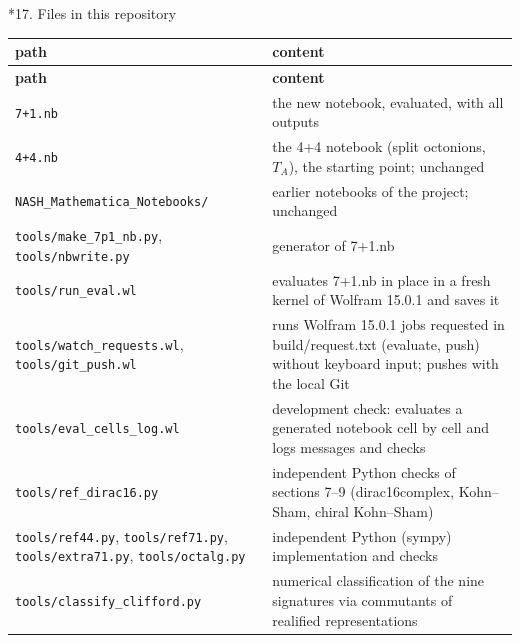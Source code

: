 \documentclass[10pt,a4paper]{article}
\makeatletter
\renewcommand\section{\@startsection{section}{1}{\z@}{-3.5ex \@plus -1ex \@minus -.2ex}{2.3ex \@plus.2ex}{\normalfont\Large\bfseries\raggedright}}
\makeatother
\begin{document}
\section*{17. Files in this repository}
{\small
\begin{longtable}{>{\raggedright\arraybackslash}p{}>{\raggedright\arraybackslash}p{}}
\toprule
\textbf{path} & \textbf{content} \\
\midrule\endfirsthead
\toprule
\textbf{path} & \textbf{content} \\
\midrule\endhead
\endfoot
\bottomrule\endlastfoot
\texttt{7+1.nb} & the new notebook, evaluated, with all outputs \\
\texttt{4+4.nb} & the 4+4 notebook (split octonions, $T_A$), the starting point; unchanged \\
\texttt{NASH\_\allowbreak{}Mathematica\_\allowbreak{}Notebooks/\allowbreak{}} & earlier notebooks of the project; unchanged \\
\texttt{tools/\allowbreak{}make\_\allowbreak{}7p1\_\allowbreak{}nb.py}, \texttt{tools/\allowbreak{}nbwrite.py} & generator of 7+1.nb \\
\texttt{tools/\allowbreak{}run\_\allowbreak{}eval.wl} & evaluates 7+1.nb in place in a fresh kernel of Wolfram 15.0.1 and saves it \\
\texttt{tools/\allowbreak{}watch\_\allowbreak{}requests.wl}, \texttt{tools/\allowbreak{}git\_\allowbreak{}push.wl} & runs Wolfram 15.0.1 jobs requested in build/request.txt (evaluate, push) without keyboard input; pushes with the local Git \\
\texttt{tools/\allowbreak{}eval\_\allowbreak{}cells\_\allowbreak{}log.wl} & development check: evaluates a generated notebook cell by cell and logs messages and checks \\
\texttt{tools/\allowbreak{}ref\_\allowbreak{}dirac16.py} & independent Python checks of sections 7–9 (dirac16complex, Kohn–Sham, chiral Kohn–Sham) \\
\texttt{tools/\allowbreak{}ref44.py}, \texttt{tools/\allowbreak{}ref71.py}, \texttt{tools/\allowbreak{}extra71.py}, \texttt{tools/\allowbreak{}octalg.py} & independent Python (sympy) implementation and checks \\
\texttt{tools/\allowbreak{}classify\_\allowbreak{}clifford.py} & numerical classification of the nine signatures via commutants of realified representations \\

\end{longtable}}
\end{document}
